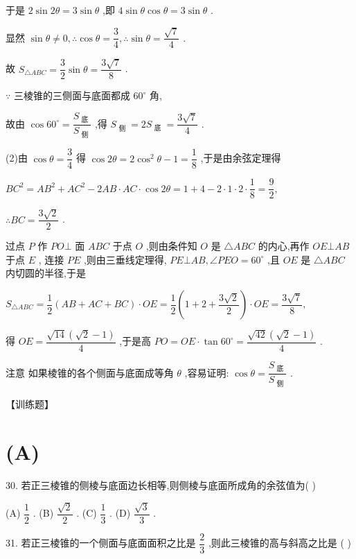 于是 $2\sin {2\theta } = 3\sin \theta$ ,即 $4\sin \theta \cos \theta  = 3\sin \theta$ .

显然 $\sin \theta  \neq  0,\therefore \cos \theta  = \dfrac{3}{4},\therefore \sin \theta  = \dfrac{\sqrt{7}}{4}$ .

故 ${S}_{\bigtriangleup {ABC}} = \dfrac{3}{2}\sin \theta  = \dfrac{3\sqrt{7}}{8}$ .

$\because$ 三棱锥的三侧面与底面都成 ${60}^{ \circ  }$ 角,

故由 $\cos {60}^{ \circ  } = \dfrac{{S}_{\text{ 底 }}}{{S}_{\text{ 侧 }}}$ ,得 ${S}_{\text{ 侧 }} = 2{S}_{\text{ 底 }} = \dfrac{3\sqrt{7}}{4}$ .

(2)由 $\cos \theta  = \dfrac{3}{4}$ 得 $\cos {2\theta } = 2{\cos }^{2}\theta  - 1 = \dfrac{1}{8}$ ,于是由余弦定理得

$B{C}^{2} = A{B}^{2} + A{C}^{2} - {2AB} \cdot  {AC} \cdot  \cos {2\theta } = 1 + 4 - 2 \cdot  1 \cdot  2 \cdot  \dfrac{1}{8} = \dfrac{9}{2},$

$\therefore {BC} = \dfrac{3\sqrt{2}}{2}$ .

过点 $P$ 作 ${PO} \bot$ 面 ${ABC}$ 于点 $O$ ,则由条件知 $O$ 是 $\bigtriangleup {ABC}$ 的内心,再作 ${OE} \bot  {AB}$ 于点 $E$ , 连接 ${PE}$ ,则由三垂线定理得, ${PE}\bot {AB},\angle {PEO} = {60}^{ \circ  }$ ,且 ${OE}$ 是 $\bigtriangleup {ABC}$ 内切圆的半径,于是

${S}_{\bigtriangleup {ABC}} = \dfrac{1}{2}\left( {{AB} + {AC} + {BC}}\right)  \cdot  {OE} = \dfrac{1}{2}\left( {1 + 2 + \dfrac{3\sqrt{2}}{2}}\right)  \cdot  {OE} = \dfrac{3\sqrt{7}}{8},$

得 ${OE} = \dfrac{\sqrt{14}\left( {\sqrt{2} - 1}\right) }{4}$ ,于是高 ${PO} = {OE} \cdot  \tan {60}^{ \circ  } = \dfrac{\sqrt{42}\left( {\sqrt{2} - 1}\right) }{4}$ .

注意 如果棱锥的各个侧面与底面成等角 $\theta$ ,容易证明: $\cos \theta  = \dfrac{{S}_{\text{ 底 }}}{{S}_{\text{ 侧 }}}$ .

【训练题】

\section*{(A)}

30. 若正三棱锥的侧棱与底面边长相等,则侧棱与底面所成角的余弦值为(   )

(A) $\dfrac{1}{2}$ . (B) $\dfrac{\sqrt{2}}{2}$ . (C) $\dfrac{1}{3}$ . (D) $\dfrac{\sqrt{3}}{3}$ .

31. 若正三棱锥的一个侧面与底面面积之比是 $\dfrac{2}{3}$ ,则此三棱锥的高与斜高之比是 (   )

